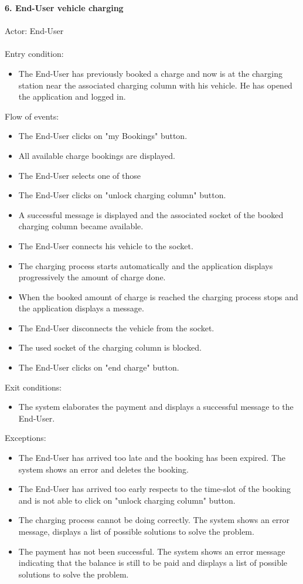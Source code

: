 \documentclass[a4paper]{report}
\begin{document}
\textbf{6. End-User vehicle charging}\label{uc:7}
\\ \\
Actor: End-User \\ \\
Entry condition: 	
\begin{itemize}
\item The End-User has previously booked a charge and now is at the charging station near the associated charging column with his vehicle. He has opened the application and logged in.
\end{itemize}
Flow of events:
\begin{itemize}
\item The End-User clicks on "my Bookings" button.
\item All available charge bookings are displayed.
\item The End-User selects one of those
\item The End-User clicks on "unlock charging column" button.
\item A successful message is displayed and the associated socket of the booked charging column became available.
\item The End-User connects his vehicle to the socket.
\item The charging process starts automatically and the application displays progressively the amount of charge done.
\item When the booked amount of charge is reached the charging process stops and the application displays a message.
\item The End-User disconnects the vehicle from the socket.
\item The used socket of the charging column is blocked.
\item The End-User clicks on "end charge" button.
\end{itemize}
Exit conditions:
\begin{itemize}
\item The system elaborates the payment and displays a successful message to the End-User.
\end{itemize}
Exceptions: 
\begin{itemize}
\item The End-User has arrived too late and the booking has been expired. The system shows an error and deletes the booking.
\item The End-User has arrived too early respects to the time-slot of the booking and is not able to click on "unlock charging column" button.
\item The charging process cannot be doing correctly. The system shows an error message, displays a list of possible solutions to solve the problem.
\item The payment has not been successful. The system shows an error message indicating that the balance is still to be paid and displays a list of possible solutions to solve the problem.
\end{itemize}
\end{document}
